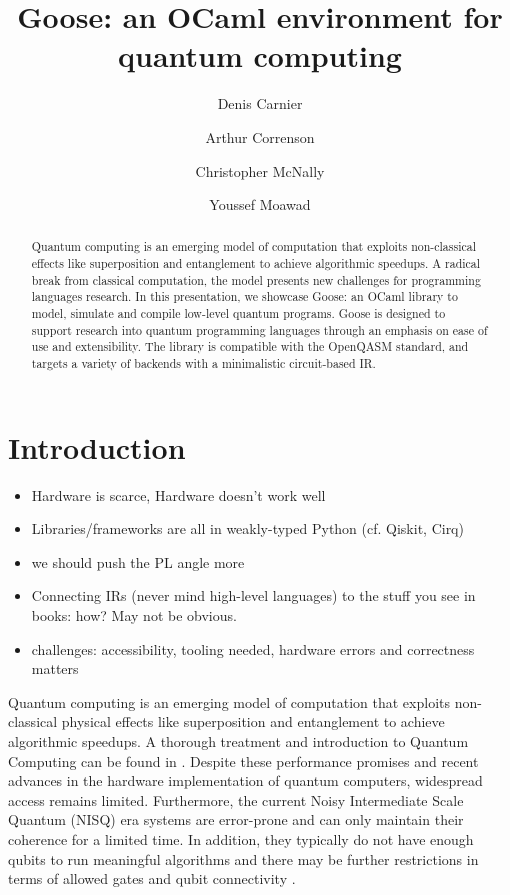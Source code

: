 \documentclass[a4paper]{easychair}
\title{Goose: an OCaml environment for quantum computing}
\author{
  Denis Carnier\inst{1}
  \and
  Arthur Correnson\inst{2}
  \and
  Christopher McNally\inst{3}
  \and
  Youssef Moawad\inst{4}
}
\institute{
  imec-DistriNet, KU Leuven
\and
  Ecole Normale Sup\'erieure de Rennes
\and
  Massachusetts Institute of Technology
\and
  University of Glasgow
}
\begin{document}
\maketitle

\begin{abstract}
Quantum computing is an emerging model of computation that exploits non-classical effects like superposition and entanglement to achieve algorithmic speedups. A radical break from classical computation, the model presents new challenges for programming languages research. In this presentation, we showcase Goose: an OCaml library to model, simulate and compile low-level quantum programs. Goose is designed to support research into quantum programming languages through an emphasis on ease of use and extensibility. The library is compatible with the OpenQASM standard, and targets a variety of backends with a minimalistic circuit-based IR.
\end{abstract}

\section{Introduction}

\begin{itemize}
\item Hardware is scarce, Hardware doesn't work well
\item Libraries/frameworks are all in weakly-typed Python (cf. Qiskit, Cirq)
\item we should push the PL angle more
\item Connecting IRs (never mind high-level languages) to the stuff you see in books: how? May not be obvious.
\item challenges: accessibility, tooling needed, hardware errors and correctness matters
\end{itemize}

\newcommand{\nisq}[0]{NISQ}

Quantum computing is an emerging model of computation that exploits non-classical physical effects like superposition and entanglement to achieve algorithmic speedups. A thorough treatment and introduction to Quantum Computing can be found in \cite{Chuang2010}. Despite these performance promises and recent advances in the hardware implementation of quantum computers, widespread access remains limited. Furthermore, the current Noisy Intermediate Scale Quantum (\nisq) \cite{Preskill2018} era systems are error-prone and can only maintain their coherence for a limited time. In addition, they typically do not have enough qubits to run meaningful algorithms and there may be further restrictions in terms of allowed gates and qubit connectivity \cite{Gyongyosi2019}.
\end{document}
